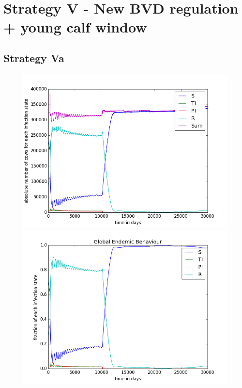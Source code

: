 \section{Strategy V - New BVD regulation + young calf window}
\subsection{Strategy Va}

\begin{figure}[htbp]
\begin{minipage}{0.5\textwidth}
\centering
\noindent\includegraphics[width=0.95\linewidth,height=\textheight,
keepaspectratio]{cont5totalEndemicNumbers.png} 
\end{minipage}
\begin{minipage}{0.5\textwidth}
\centering
\noindent\includegraphics[width=0.95\linewidth,height=\textheight,
keepaspectratio]{cont5endemicFractions.png} 
\end{minipage}
\caption[Endemic Behavior in Containment Strategy One]{}
\label{fig:demographyScen8}
\end{figure}

